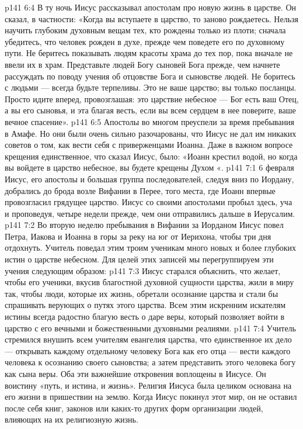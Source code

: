 \vs p141 6:4 \pc В ту ночь Иисус рассказывал апостолам про новую жизнь в царстве. Он сказал, в частности: «Когда вы вступаете в царство, то заново рождаетесь. Нельзя научить глубоким духовным вещам тех, кто рождены только из плоти; сначала убедитесь, что человек рожден в духе, прежде чем поведете его по духовному пути. Не беритесь показывать людям красоты храма до тех пор, пока вначале не ввели их в храм. Представьте людей Богу  сыновей Бога прежде, чем начнете рассуждать по поводу учения об отцовстве Бога и сыновстве людей. Не боритесь с людьми --- всегда будьте терпеливы. Это не ваше царство; вы только посланцы. Просто идите вперед, провозглашая: это царствие небесное --- Бог есть ваш Отец, а вы его сыновья, и эта благая весть, если вы всем сердцем в нее поверите,  ваше вечное спасение».
\vs p141 6:5 Апостолы во многом преуспели за время пребывания в Амафе. Но они были очень сильно разочарованы, что Иисус не дал им никаких советов о том, как вести себя с приверженцами Иоанна. Даже в важном вопросе крещения единственное, что сказал Иисус, было: «Иоанн крестил водой, но когда вы войдете в царство небесное, вы будете крещены Духом «.
\vs p141 7:1 6 февраля Иисус, его апостолы и большая группа последователей, следуя вниз по Иордану, добрались до брода возле Вифании в Перее, того места, где Иоанн впервые провозгласил грядущее царство. Иисус со своими апостолами пробыл здесь, уча и проповедуя, четыре недели прежде, чем они отправились дальше в Иерусалим.
\vs p141 7:2 Во вторую неделю пребывания в Вифании за Иорданом Иисус повел Петра, Иакова и Иоанна в горы за реку на юг от Иерихона, чтобы три дня отдохнуть. Учитель поведал этим троим ученикам много новых и более глубоких истин о царстве небесном. Для целей этих записей мы перегруппируем эти учения следующим образом:
\vs p141 7:3 \pc Иисус старался объяснить, что желает, чтобы его ученики, вкусив благостной духовной сущности царства, жили в миру так, чтобы люди, которые  их жизнь, обретали осознание царства и стали бы спрашивать верующих о путях этого царства. Всем этим искренним искателям истины всегда радостно  благую весть о даре веры, который позволяет войти в царство с его вечными и божественными духовными реалиями.
\vs p141 7:4 Учитель стремился внушить всем учителям евангелия царства, что единственное их дело --- открывать каждому отдельному человеку Бога как его отца --- вести каждого человека к осознанию своего сыновства; а затем представить этого человека богу как сына веры. Оба эти важнейшие откровения воплощены в Иисусе. Он воистину «путь, и истина, и жизнь». Религия Иисуса была целиком основана на его жизни в пришествии на землю. Когда Иисус покинул этот мир, он не оставил после себя книг, законов или каких\hyp{}то других форм организации людей, влияющих на их религиозную жизнь.
